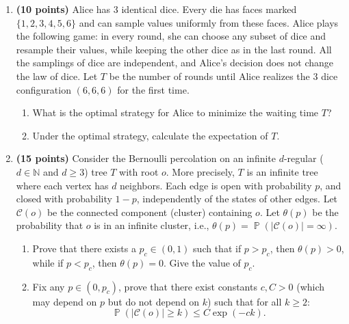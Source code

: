 \documentclass[11pt,a4paper]{article}
\DeclareMathOperator{\Pbb}{\mathbb{P}}
\begin{document}
\begin{enumerate}[label=\textbf{\arabic*.}]
    \item \textbf{(10 points)} Alice has 3 identical dice. Every die has faces marked $\{1, 2, 3, 4, 5, 6\}$ and can sample values uniformly from these faces. Alice plays the following game: in every round, she can choose any subset of dice and resample their values, while keeping the other dice as in the last round. All the samplings of dice are independent, and Alice's decision does not change the law of dice. Let $T$ be the number of rounds until Alice realizes the 3 dice configuration $(6, 6, 6)$ for the first time.
    \begin{enumerate}[label=(\alph*)]
        \item What is the optimal strategy for Alice to minimize the waiting time $T$?
        \item Under the optimal strategy, calculate the expectation of $T$.
    \end{enumerate}

    \item \textbf{(15 points)} Consider the Bernoulli percolation on an infinite $d$-regular ($d \in \mathbb{N}$ and $d \ge 3$) tree $T$ with root $o$. More precisely, $T$ is an infinite tree where each vertex has $d$ neighbors. Each edge is open with probability $p$, and closed with probability $1 - p$, independently of the states of other edges. Let $\mathcal{C}(o)$ be the connected component (cluster) containing $o$. Let $\theta(p)$ be the probability that $o$ is in an infinite cluster, i.e., $\theta(p) = \Pbb(|\mathcal{C}(o)| = \infty)$.
    \begin{enumerate}[label=(\alph*)]
        \item Prove that there exists a $p_c \in (0, 1)$ such that if $p > p_c$, then $\theta(p) > 0$, while if $p < p_c$, then $\theta(p) = 0$. Give the value of $p_c$.
        \item Fix any $p \in (0, p_c)$, prove that there exist constants $c, C > 0$ (which may depend on $p$ but do not depend on $k$) such that for all $k \ge 2$:
        \[
        \Pbb(|\mathcal{C}(o)| \ge k) \le C \exp(-ck).
        \]
    \end{enumerate}


\end{enumerate}
\end{document}
